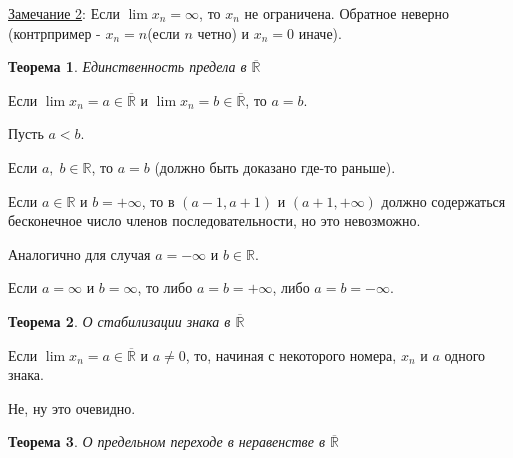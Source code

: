 \documentclass[12pt,letterpaper]{report}
\makeatletter
\newtheorem*{theorem-non}{Теорема}
\theoremstyle{definition}
\renewenvironment{proof}[1][\proofname]{%
   \par\pushQED{\qed}\normalfont%
   \topsep6\p@\@plus6\p@\relax
   \trivlist\item[\hskip\labelsep\bfseries#1\@addpunct{.}]%
   \ignorespaces
}{%
   \popQED\endtrivlist\@endpefalse
}
\makeatother
\begin{document}
    \underline{Замечание 2}: Если $\lim x_n = \infty$, то ${x_n}$ не ограничена. Обратное неверно (контрпример - $x_n = n$(если $n$ четно) и $x_n = 0$ иначе).
    \vspace{0.3cm}
    
    \begin{theorem-non} Единственность предела в $\overline{\mathbb{R}}$
    \end{theorem-non}
    Если $\lim x_n = a \in \overline{\mathbb{R}}$ и $\lim x_n = b \in \overline{\mathbb{R}}$, то $a = b$.
    \begin{proof}
        Пусть $a < b$. 
        
        Если $a,\;b \in \mathbb{R}$, то $a = b$ (должно быть доказано где-то раньше).
        
        Если $a \in \mathbb{R}$ и $b = +\infty$, то в $(a - 1, a + 1)$ и $(a + 1, +\infty)$ должно содержаться бесконечное число членов последовательности, но это невозможно. 
        
        Аналогично для случая  $a = -\infty$ и $b \in \mathbb{R}$.
        
        Если $a = \infty$ и $b = \infty$, то либо $a = b = +\infty$, либо $a = b = -\infty$.
    \end{proof}
    \begin{theorem-non} О стабилизации знака в $\overline{\mathbb{R}}$  \end{theorem-non}
    Если $\lim x_n = a \in \overline{\mathbb{R}}$ и $a \neq 0$, то, начиная с некоторого номера, $x_n$ и $a$ одного знака. 
    \begin{proof}
        Не, ну это очевидно.
    \end{proof}
    \begin{theorem-non} О предельном переходе в неравенстве в $\overline{\mathbb{R}}$ \end{theorem-non}
\end{document}
